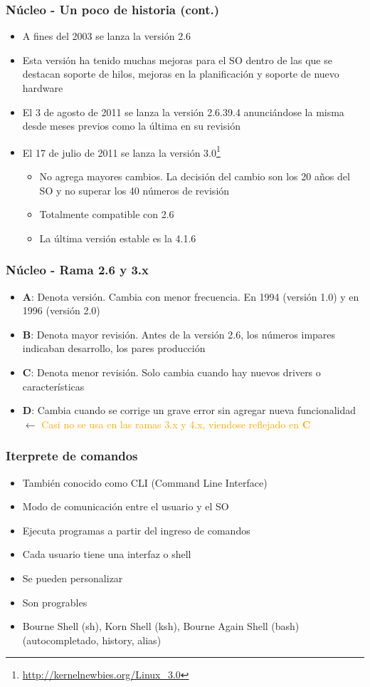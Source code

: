 \begin{frame}
	\frametitle{Núcleo - Un poco de historia (cont.)}
	\begin{itemize}
		\item A fines del 2003 se lanza la versión 2.6		
		\item Esta versión ha tenido muchas mejoras para el SO dentro de las que se destacan soporte de hilos, mejoras en la planificación y soporte de nuevo hardware
		\item El 3 de agosto de 2011 se lanza la versión 2.6.39.4
		anunciándose la misma desde meses previos como la última en su revisión
		\item El 17 de julio de 2011 se lanza la versión 3.0\footnote{\url{http://kernelnewbies.org/Linux_3.0}}
			\begin{itemize}
				\item No agrega mayores cambios. La decisión del cambio son los 20 años del SO y no superar los 40 números de revisión
				\item Totalmente compatible con 2.6
				\item La última versión estable es la 4.1.6
			\end{itemize}
	\end{itemize}
\end{frame}

\begin{frame}
	\frametitle{Núcleo - Rama 2.6 y 3.x}
	\begin{itemize}
		\item \textbf{A}: Denota versión. Cambia con menor frecuencia. En 1994 (versión 1.0) y en 1996 (versión 2.0)
		\item \textbf{B}: Denota mayor revisión. Antes de la versión 2.6, los números impares indicaban desarrollo, los pares producción
		\item \textbf{C}: Denota menor revisión. Solo cambia cuando hay nuevos drivers o características
		\item \textbf{D}: Cambia cuando se corrige un grave error sin agregar nueva funcionalidad $\leftarrow$ \textcolor{orange}{Casi no se usa en las ramas 3.x y 4.x, viendose reflejado en \textbf{C}}
	\end{itemize}
\end{frame}

\begin{frame}
	\frametitle{Iterprete de comandos}
	\begin{itemize}
		\item También conocido como CLI (Command Line Interface)
		\item Modo de comunicación entre el usuario y el SO
		\item Ejecuta programas a partir del ingreso de comandos
		\item Cada usuario tiene una interfaz o shell
		\item Se pueden personalizar
		\item Son progrables
		\item Bourne Shell (sh), Korn Shell (ksh), Bourne Again Shell (bash)(autocompletado, history, alias)
	\end{itemize}
\end{frame}


